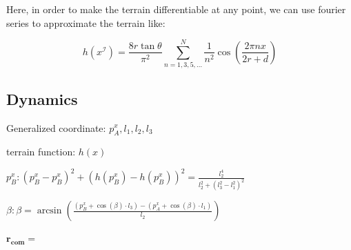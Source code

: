 \documentclass[11pt]{article}
\begin{document}
Here, in order to make the terrain differentiable at any point, we can use fourier series to approximate the terrain like:

\[
h(x^\mathcal{I}) = \frac{8 r \tan\theta}{\pi^2} \sum_{n=1,3,5,\dots}^{N} \frac{1}{n^2} \cos\left( \frac{2\pi n x}{2r + d} \right)
\]



\newpage
\subsection{Dynamics}
\indent

Generalized coordinate: \(p_A^x, l_1, l_2, l_3\)

terrain function: \(h(x)\)

\(p_B^x: (p_B^x - p_B^x)^2 + (h(p_B^x) - h(p_B^x))^2 = \frac{l_2^4}{l_2^2+(l_3^2 - l_1^2)^2}\)

\(\beta: \beta = \arcsin(\frac{(p_B^x+\cos(\beta) \cdot l_3) - (p_A^x+\cos(\beta) \cdot l_1)}{l_2})\)

\(\mathbf{r_{com}} = \)
\end{document}

